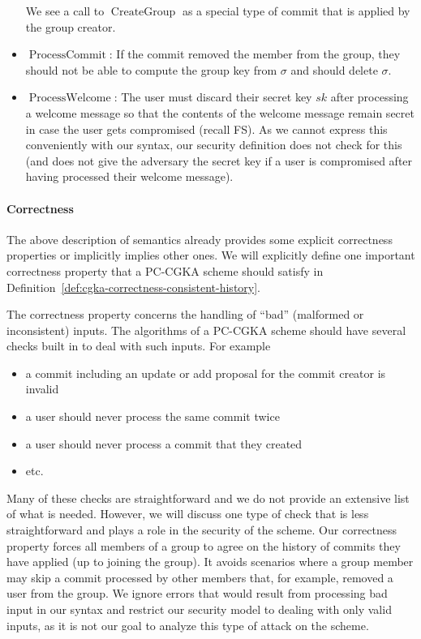 \begin{itemize}
	      We see a call to $\operatorname{CreateGroup}$ as a special type of commit that is applied by the group creator.


	\item $\operatorname{ProcessCommit}$: If the commit removed the member from the group, they should not be able to compute the group key from $\sigma$ and should delete $\sigma$.
	\item $\operatorname{ProcessWelcome}$:  The user must discard their secret key $sk$ after processing a welcome message so that the contents of the welcome message remain secret in case the user gets compromised (recall FS). As we cannot express this conveniently with our syntax, our security definition does not check for this (and does not give the adversary the secret key if a user is compromised after having processed their welcome message).
\end{itemize}

\paragraph{Correctness}

The above description of semantics already provides some explicit correctness properties or implicitly implies other ones. We will explicitly define one important correctness property that a PC-CGKA scheme should satisfy in Definition~\ref{def:cgka-correctness-consistent-history}.

The correctness property concerns the handling of ``bad'' (malformed or inconsistent) inputs. The algorithms of a PC-CGKA scheme should have several checks built in to deal with such inputs. For example
\begin{itemize}
	\item a commit including an update or add proposal for the commit creator is invalid
	\item a user should never process the same commit twice
	\item a user should never process a commit that they created
	\item etc.
\end{itemize}
Many of these checks are straightforward and we do not provide an extensive list of what is needed. However, we will discuss one type of check that is less straightforward and plays a role in the security of the scheme. Our correctness property forces all members of a group to agree on the history of commits they have applied (up to joining the group). It avoids scenarios where a group member may skip a commit processed by other members that, for example, removed a user from the group. We ignore errors that would result from processing bad input in our syntax and restrict our security model to dealing with only valid inputs, as it is not our goal to analyze this type of attack on the scheme.


